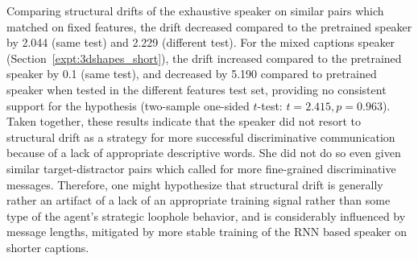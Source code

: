 Comparing structural drifts of the exhaustive speaker on similar pairs which matched on fixed features, the drift decreased compared to the pretrained speaker by 2.044 (same test) and 2.229 (different test). For the mixed captions speaker (Section~\ref{expt:3dshapes_short}), the drift increased compared to the pretrained speaker by 0.1 (same test), and decreased by 5.190 compared to pretrained speaker when tested in the different features test set, providing no consistent support for the hypothesis (two-sample one-sided $t$-test: $t=2.415, p=0.963$). Taken together, these results indicate that the speaker did not resort to structural drift as a strategy for more successful discriminative communication because of a lack of appropriate descriptive words. She did not do so even given similar target-distractor pairs which called for more fine-grained discriminative messages. Therefore, one might hypothesize that structural drift is generally rather an artifact of a lack of an appropriate training signal rather than some type of the agent's strategic loophole behavior, and is considerably influenced by message lengths, mitigated by more stable training of the RNN based speaker on shorter captions.
\newline

